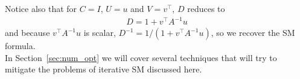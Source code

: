 \documentclass[11pt]{article}
\numberwithin{figure}{section}
\numberwithin{table}{section}
\begin{document}
			Notice also that for $C=I$, $U=u$ and $V=v^\top$, $D$ reduces to
			\begin{align}
				D = 1 + v^\top A^{-1} u
			\end{align}
			and because $v^\top A^{-1} u$ is scalar,  $D^{-1}=1/\left(1 + v^\top A^{-1} u\right)$, so we recover the SM formula.\\
 
			In Section~\ref{sec:num_opt} we will cover several techniques that will try to mitigate the problems of iterative SM discussed here.
			
%			
\end{document}
